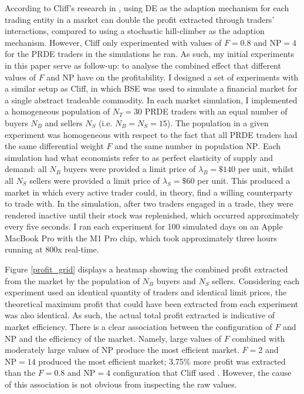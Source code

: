 \documentclass[conference]{IEEEtran}
\begin{document}
According to Cliff's research in \cite{PRDE}, using DE as the adaption mechanism for each trading entity in a market can double the profit extracted through traders' interactions, compared to using a stochastic hill-climber as the adaption mechanism.
However, Cliff only experimented with values of $F=0.8$ and $\mathrm{NP}=4$ for the PRDE traders in the simulations he ran.
As such, my initial experiments in this paper serve as follow-up: to analyse the combined effect that different values of $F$ and $\mathrm{NP}$ have on the profitability.
I designed a set of experiments with a similar setup as Cliff, in which BSE was used to simulate a financial market for a single abstract tradeable commodity.
In each market simulation, I implemented a homogeneous population of $N_T=30$ PRDE traders with an equal number of buyers $N_B$ and sellers $N_S$ (i.e. $N_B=N_S=15$).
The population in a given experiment was homogeneous with respect to the fact that all PRDE traders had the same differential weight $F$ and the same number in population $\mathrm{NP}$.
Each simulation had what economists refer to as perfect elasticity of supply and demand: all $N_B$ buyers were provided a limit price of $\lambda_B=\$140$ per unit, whilst all $N_S$ sellers were provided a limit price of $\lambda_S=\$60$ per unit.
This produced a market in which every active trader could, in theory, find a willing counterparty to trade with.
In the simulation, after two traders engaged in a trade, they were rendered inactive until their stock was replenished, which occurred approximately every five seconds.
I ran each experiment for 100 simulated days on an Apple MacBook Pro with the M1 Pro chip, which took approximately three hours running at 800x real-time.

Figure \ref{profit_grid} displays a heatmap showing the combined profit extracted from the market by the population of $N_B$ buyers and $N_S$ sellers.
Considering each experiment used an identical quantity of traders and identical limit prices, the theoretical maximum profit that could have been extracted from each experiment was also identical.
As such, the actual total profit extracted is indicative of market efficiency.
There is a clear association between the configuration of $F$ and $\mathrm{NP}$ and the efficiency of the market.
Namely, large values of $F$ combined with moderately large values of $\mathrm{NP}$ produce the most efficient market.
$F=2$ and $\mathrm{NP}=14$ produced the most efficient market; 3.75\% more profit was extracted than the $F=0.8$ and $\mathrm{NP}=4$ configuration that Cliff used \cite{PRDE}.
However, the cause of this association is not obvious from inspecting the raw values.
\end{document}
